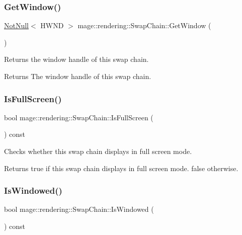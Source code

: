 \subsubsection{\texorpdfstring{Get\+Window()}{GetWindow()}}
{\footnotesize\ttfamily \mbox{\hyperlink{namespacemage_a8769f9d670d6b585ea306cb1062af94b}{Not\+Null}}$<$ H\+W\+ND $>$ mage\+::rendering\+::\+Swap\+Chain\+::\+Get\+Window (\begin{DoxyParamCaption}{ }\end{DoxyParamCaption})\hspace{0.3cm}{\ttfamily [noexcept]}}

Returns the window handle of this swap chain.

\begin{DoxyReturn}{Returns}
The window handle of this swap chain. 
\end{DoxyReturn}
\mbox{\label{classmage_1_1rendering_1_1_swap_chain_aa5643411827a2eccd04e46368193b762}} 
\subsubsection{\texorpdfstring{Is\+Full\+Screen()}{IsFullScreen()}}
{\footnotesize\ttfamily bool mage\+::rendering\+::\+Swap\+Chain\+::\+Is\+Full\+Screen (\begin{DoxyParamCaption}{ }\end{DoxyParamCaption}) const\hspace{0.3cm}{\ttfamily [noexcept]}}

Checks whether this swap chain displays in full screen mode.

\begin{DoxyReturn}{Returns}
{\ttfamily true} if this swap chain displays in full screen mode. {\ttfamily false} otherwise. 
\end{DoxyReturn}
\mbox{\label{classmage_1_1rendering_1_1_swap_chain_a7059719bc0f821baada358534b935778}} 
\subsubsection{\texorpdfstring{Is\+Windowed()}{IsWindowed()}}
{\footnotesize\ttfamily bool mage\+::rendering\+::\+Swap\+Chain\+::\+Is\+Windowed (\begin{DoxyParamCaption}{ }\end{DoxyParamCaption}) const\hspace{0.3cm}{\ttfamily [noexcept]}}

